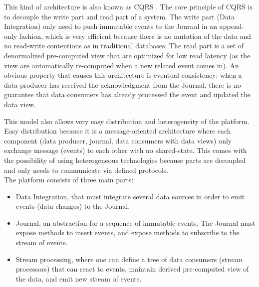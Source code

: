 This kind of architecture is also known as CQRS . The core principle of CQRS is to decouple the write part and read part
of a system. The write part (Data Integration) only need to push immutable events to the Journal in an append-only fashion, which
is very efficient because there is no mutation of the data and no read-write contentions as in traditional databases.
The read part is a set of denormalized pre-computed view that are optimized for low read latency (as the view are automatically re-computed
when a new related event comes in).
An obvious property that causes this architecture is eventual consistency: when a data producer has received the acknowledgment
from the Journal, there is no guarantee that data consumers has already processed the event and updated the data view.

This model also allows very easy distribution and heterogeneity of the platform. Easy distribution because it is a message-oriented
architecture where each component (data producer, journal, data consumers with data views) only exchange message (events) to each other with
no shared-state. This comes with the possibility of using heterogeneous technologies because parts are decoupled and only needs
to communicate via defined protocols.
\\

The platform consists of three main parts: 
\begin{itemize}
  \item Data Integration, that must integrate several data sources in order to emit 
events (data changes) to the Journal. 
  \item Journal, an abstraction for a sequence of immutable events. The Journal must expose methods to insert events,
  and expose methods to subscribe to the stream of events.
  \item Stream processing, where one can define a tree of data consumers (stream processors) that can react to
  events, maintain derived pre-computed view of the data, and emit new stream of events.
\end{itemize}

